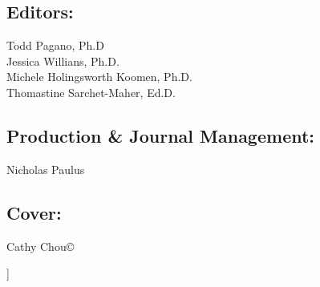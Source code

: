 \documentclass[11.5pt]{sig-alternate}
\begin{document}
\begin{@twocolumnfalse}
\subsection*{Editors:}
Todd Pagano, Ph.D\\
Jessica Willians, Ph.D.\\
Michele Holingsworth Koomen, Ph.D.\\
Thomastine Sarchet-Maher, Ed.D.

\subsection*{Production \& Journal Management:}
Nicholas Paulus

\subsection*{Cover:}
Cathy Chou©


\end{@twocolumnfalse}
]
\end{document}
